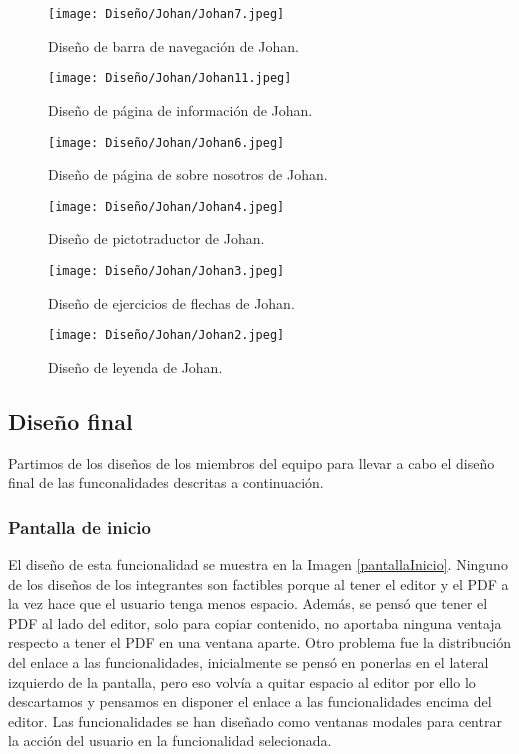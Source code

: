 \begin{figure}[ht!]
  \centering
  \texttt{[image: Diseño/Johan/Johan7.jpeg]}
  \caption{Diseño de barra de navegación de Johan.}
  \label{Johan7}
\end{figure}

\begin{figure}[ht!]
  \centering
  \texttt{[image: Diseño/Johan/Johan11.jpeg]}
  \caption{Diseño de página de información de Johan.}
  \label{Johan11}
\end{figure}

\begin{figure}[ht!]
  \centering
  \texttt{[image: Diseño/Johan/Johan6.jpeg]}
  \caption{Diseño de página de sobre nosotros de Johan.}
  \label{Johan6}
\end{figure}

\begin{figure}[ht!]
  \centering
  \texttt{[image: Diseño/Johan/Johan4.jpeg]}
  \caption{Diseño de pictotraductor de Johan.}
  \label{Johan4}
\end{figure}

\begin{figure}[ht!]
  \centering
  \texttt{[image: Diseño/Johan/Johan3.jpeg]}
  \caption{Diseño de ejercicios de flechas de Johan.}
  \label{Johan3}
\end{figure}

\begin{figure}[ht!]
  \centering
  \texttt{[image: Diseño/Johan/Johan2.jpeg]}
  \caption{Diseño de leyenda de Johan.}
  \label{Johan2}
\end{figure}

\subsection{Diseño final}
Partimos de los diseños de los miembros del equipo para llevar a cabo el diseño final de las funconalidades descritas a continuación. 
\subsubsection{Pantalla de inicio}
El diseño de esta funcionalidad se muestra en la Imagen \ref{pantallaInicio}. Ninguno de los diseños de los integrantes  son factibles porque al tener el editor y el PDF a la vez hace que el usuario tenga menos espacio. Además, se pensó que tener el PDF al lado del editor, solo para copiar contenido, no aportaba ninguna ventaja respecto a tener el PDF en una ventana aparte. Otro problema fue la distribución del enlace a las funcionalidades, inicialmente se pensó en ponerlas en el lateral izquierdo de la pantalla, pero eso volvía a quitar espacio al editor por ello lo descartamos y pensamos en disponer el enlace a las funcionalidades encima del editor. Las funcionalidades se han diseñado como ventanas modales para centrar la acción del usuario en la funcionalidad selecionada. 

